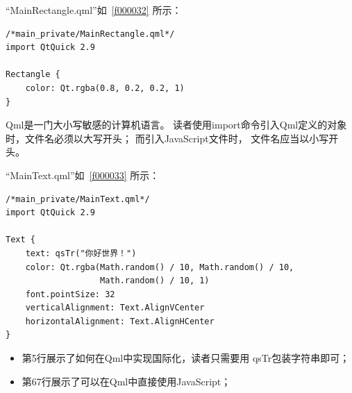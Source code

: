 “MainRectangle.qml”如\lstlistingname\ \ref{f000032}
所示：
\FloatBarrier
\begin{lstlisting}[label=f000032,
caption=GoodLuck,
title=\lstlistingname\ \thelstlisting\marginnote{\fbox{\footnotesize{\lstlistingname\ \thelstlisting}}}
]
/*main_private/MainRectangle.qml*/
import QtQuick 2.9

Rectangle {
    color: Qt.rgba(0.8, 0.2, 0.2, 1)
}
\end{lstlisting}          %

Qml是一门大小写敏感的计算机语言。
读者使用import命令引入Qml定义的对象时，文件名必须以大写开头；
而引入JavaScript文件时，
文件名应当以小写开头。

“MainText.qml”如\lstlistingname\ \ref{f000033}
所示：

\FloatBarrier
\begin{lstlisting}[label=f000033,
caption=GoodLuck,
title=\lstlistingname\ \thelstlisting\marginnote{\fbox{\footnotesize{\lstlistingname\ \thelstlisting}}}
]
/*main_private/MainText.qml*/
import QtQuick 2.9

Text {
    text: qsTr("你好世界！")
    color: Qt.rgba(Math.random() / 10, Math.random() / 10,
                   Math.random() / 10, 1)
    font.pointSize: 32
    verticalAlignment: Text.AlignVCenter
    horizontalAlignment: Text.AlignHCenter
}
\end{lstlisting}          %

\begin{itemize}

\item 第5行展示了如何在Qml中实现国际化，读者只需要用
qsTr包装字符串即可；
\item 第6\raisebox{0.16ex}{\sourcefonttwo\~{}}7行展示了可以在Qml中直接使用JavaScript；


\end{itemize}













